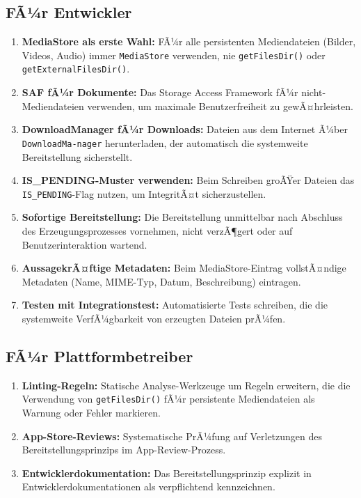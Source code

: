 ﻿\documentclass[12pt, a4paper]{article}
\begin{document}
\subsection{FÃ¼r Entwickler}

\begin{enumerate}[label=\textbf{E\arabic*.}]
  \item \textbf{MediaStore als erste Wahl:} FÃ¼r alle persistenten Mediendateien
    (Bilder, Videos, Audio) immer \texttt{MediaStore} verwenden, nie
    \texttt{getFilesDir()} oder \texttt{getExternalFiles\newline Dir()}.
  \item \textbf{SAF fÃ¼r Dokumente:} Das Storage Access Framework fÃ¼r
    nicht-Mediendateien verwenden, um maximale Benutzerfreiheit zu gewÃ¤hrleisten.
  \item \textbf{DownloadManager fÃ¼r Downloads:} Dateien aus dem Internet Ã¼ber
    \texttt{DownloadMa-\newline nager} herunterladen, der automatisch die systemweite
    Bereitstellung sicherstellt.
  \item \textbf{IS\_PENDING-Muster verwenden:} Beim Schreiben groÃŸer Dateien
    das \texttt{IS\_PEN\newline DING}-Flag nutzen, um IntegritÃ¤t sicherzustellen.
  \item \textbf{Sofortige Bereitstellung:} Die Bereitstellung unmittelbar nach
    Abschluss des Erzeugungsprozesses vornehmen, nicht verzÃ¶gert oder auf
    Benutzerinteraktion wartend.
  \item \textbf{AussagekrÃ¤ftige Metadaten:} Beim MediaStore-Eintrag vollstÃ¤ndige
    Metadaten (Name, MIME-Typ, Datum, Beschreibung) eintragen.
  \item \textbf{Testen mit Integrationstest:} Automatisierte Tests schreiben,
    die die systemweite VerfÃ¼gbarkeit von erzeugten Dateien prÃ¼fen.
\end{enumerate}

\subsection{FÃ¼r Plattformbetreiber}

\begin{enumerate}[label=\textbf{P\arabic*.}]
  \item \textbf{Linting-Regeln:} Statische Analyse-Werkzeuge um Regeln erweitern,
    die die Verwendung von \texttt{getFilesDir()} fÃ¼r persistente Mediendateien
    als Warnung oder Fehler markieren.
  \item \textbf{App-Store-Reviews:} Systematische PrÃ¼fung auf Verletzungen des
    Bereitstellungsprinzips im App-Review-Prozess.
  \item \textbf{Entwicklerdokumentation:} Das Bereitstellungsprinzip explizit in
    Entwicklerdokumentationen als verpflichtend kennzeichnen.
\end{enumerate}
\end{document}
